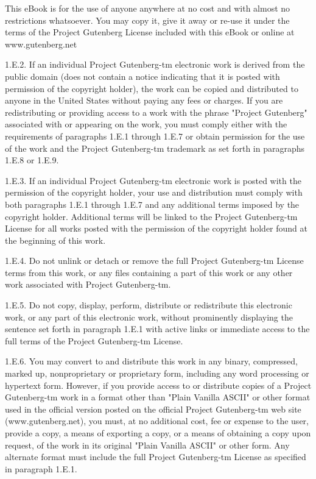 This eBook is for the use of anyone anywhere at no cost and with
almost no restrictions whatsoever.  You may copy it, give it away or
re-use it under the terms of the Project Gutenberg License included
with this eBook or online at www.gutenberg.net

1.E.2.  If an individual Project Gutenberg-tm electronic work is derived
from the public domain (does not contain a notice indicating that it is
posted with permission of the copyright holder), the work can be copied
and distributed to anyone in the United States without paying any fees
or charges.  If you are redistributing or providing access to a work
with the phrase "Project Gutenberg" associated with or appearing on the
work, you must comply either with the requirements of paragraphs 1.E.1
through 1.E.7 or obtain permission for the use of the work and the
Project Gutenberg-tm trademark as set forth in paragraphs 1.E.8 or
1.E.9.

1.E.3.  If an individual Project Gutenberg-tm electronic work is posted
with the permission of the copyright holder, your use and distribution
must comply with both paragraphs 1.E.1 through 1.E.7 and any additional
terms imposed by the copyright holder.  Additional terms will be linked
to the Project Gutenberg-tm License for all works posted with the
permission of the copyright holder found at the beginning of this work.

1.E.4.  Do not unlink or detach or remove the full Project Gutenberg-tm
License terms from this work, or any files containing a part of this
work or any other work associated with Project Gutenberg-tm.

1.E.5.  Do not copy, display, perform, distribute or redistribute this
electronic work, or any part of this electronic work, without
prominently displaying the sentence set forth in paragraph 1.E.1 with
active links or immediate access to the full terms of the Project
Gutenberg-tm License.

1.E.6.  You may convert to and distribute this work in any binary,
compressed, marked up, nonproprietary or proprietary form, including any
word processing or hypertext form.  However, if you provide access to or
distribute copies of a Project Gutenberg-tm work in a format other than
"Plain Vanilla ASCII" or other format used in the official version
posted on the official Project Gutenberg-tm web site (www.gutenberg.net),
you must, at no additional cost, fee or expense to the user, provide a
copy, a means of exporting a copy, or a means of obtaining a copy upon
request, of the work in its original "Plain Vanilla ASCII" or other
form.  Any alternate format must include the full Project Gutenberg-tm
License as specified in paragraph 1.E.1.

